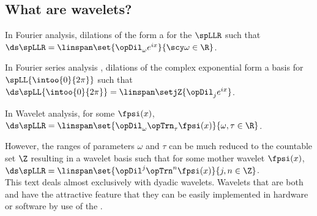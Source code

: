 \subsection{What are wavelets?}
In Fourier analysis,  {dilations}  of the  
form a    for the  $\spLLR$  
such that
  \\\indentx$\ds\spLLR=\linspan\set{\opDil_\omega e^{ix}}{\scy\omega\in\R}$.

In Fourier series analysis ,  dilations of the complex exponential 
form a  basis for $\spLL{\intoo{0}{2\pi}}$ such that
  \\\indentx$\ds\spLL{\intoo{0}{2\pi}}=\linspan\setjZ{\opDil_j e^{ix}}$.

In Wavelet analysis, for some   $\fpsi(x)$,
  \\\indentx$\ds\spLLR=\linspan\set{\opDil_\omega\opTrn_\tau \fpsi(x)}{\omega,\tau\in\R}$.

However, the ranges of parameters $\omega$ and $\tau$ can be much reduced to the countable set $\Z$ resulting in
a  wavelet basis such that for some mother wavelet $\fpsi(x)$,
  \\\indentx$\ds\spLLR=\linspan\set{\opDil^j\opTrn^n \fpsi(x)}{j,n\in\Z}$.\\
This text deals almost exclusively with dyadic wavelets. 
Wavelets that are both  and  have the attractive feature 
that they can be easily implemented in hardware or software by use of the 
 .


